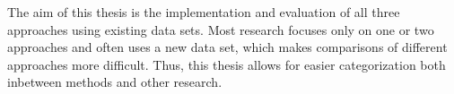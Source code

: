 The aim of this thesis is the implementation and evaluation of all three approaches using existing data sets. Most research focuses only on one or two approaches and often uses a new data set, which makes comparisons of different approaches more difficult. Thus, this thesis allows for easier categorization both inbetween methods and other research.







